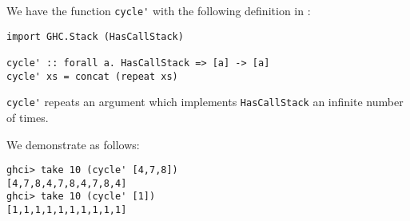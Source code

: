 
We have the function \verb|cycle'| with the following 
definition in :
\begin{verbatim}
import GHC.Stack (HasCallStack)

cycle' :: forall a. HasCallStack => [a] -> [a]
cycle' xs = concat (repeat xs)
\end{verbatim}
\verb|cycle'| repeats an argument which implements \verb|HasCallStack| an
infinite number of times.\par
\qquad We demonstrate as follows:
\begin{verbatim}
ghci> take 10 (cycle' [4,7,8])
[4,7,8,4,7,8,4,7,8,4]
ghci> take 10 (cycle' [1])
[1,1,1,1,1,1,1,1,1,1]
\end{verbatim}
